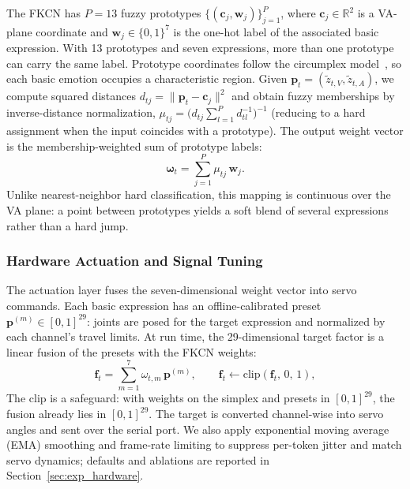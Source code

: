 \documentclass[letterpaper, 10 pt, conference]{ieeeconf/ieeeconf}
\begin{document}
The FKCN has $P = 13$ fuzzy prototypes $\{(\mathbf{c}_j, \mathbf{w}_j)\}_{j=1}^{P}$, where $\mathbf{c}_j \in \mathbb{R}^2$ is a VA-plane coordinate and $\mathbf{w}_j\in\{0,1\}^{7}$ is the one-hot label of the associated basic expression. With 13 prototypes and seven expressions, more than one prototype can carry the same label. Prototype coordinates follow the circumplex model~\cite{russell1980circumplex}, so each basic emotion occupies a characteristic region.
Given $\mathbf{p}_t = (\tilde{z}_{t,V}, \tilde{z}_{t,A})$, we compute squared distances $d_{tj} = \|\mathbf{p}_t - \mathbf{c}_j\|^2$ and obtain fuzzy memberships by inverse-distance normalization,
$\mu_{tj} = \bigl(d_{tj}\sum_{l=1}^{P} d_{tl}^{-1}\bigr)^{-1}$ (reducing to a hard assignment when the input coincides with a prototype).
The output weight vector is the membership-weighted sum of prototype labels:
\begin{equation}
    \boldsymbol{\omega}_t = \sum_{j=1}^{P} \mu_{tj}\, \mathbf{w}_j .
    \label{eq:fkcn}
\end{equation}
Unlike nearest-neighbor hard classification, this mapping is continuous over the VA plane: a point between prototypes yields a soft blend of several expressions rather than a hard jump.

\subsubsection{Hardware Actuation and Signal Tuning}
The actuation layer fuses the seven-dimensional weight vector into servo commands.
Each basic expression has an offline-calibrated preset $\mathbf{p}^{(m)} \in [0,1]^{29}$: joints are posed for the target expression and normalized by each channel's travel limits.
At run time, the 29-dimensional target factor is a linear fusion of the presets with the FKCN weights:
\begin{equation}
    \mathbf{f}_t = \sum_{m=1}^{7} \omega_{t,m}\, \mathbf{p}^{(m)}, \qquad \mathbf{f}_t \leftarrow \mathrm{clip}(\mathbf{f}_t,\, 0,\, 1),
    \label{eq:fusion}
\end{equation}
The clip is a safeguard: with weights on the simplex and presets in $[0,1]^{29}$, the fusion already lies in $[0,1]^{29}$. The target is converted channel-wise into servo angles and sent over the serial port. We also apply exponential moving average (EMA) smoothing and frame-rate limiting to suppress per-token jitter and match servo dynamics; defaults and ablations are reported in Section~\ref{sec:exp_hardware}.
\end{document}
